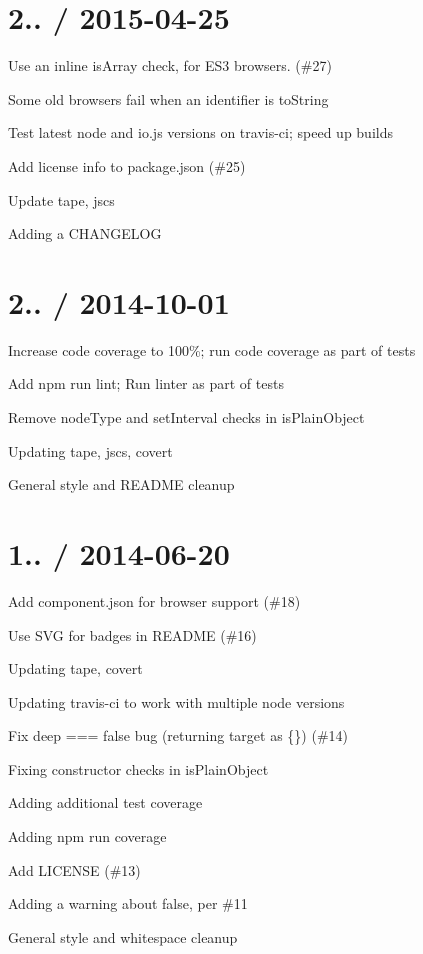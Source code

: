 \section*{2.. / 2015-\/04-\/25 }


\begin{DoxyItemize}
\item Use an inline {\ttfamily is\+Array} check, for E\+S3 browsers. (\#27)
\item Some old browsers fail when an identifier is {\ttfamily to\+String}
\item Test latest {\ttfamily node} and {\ttfamily io.\+js} versions on {\ttfamily travis-\/ci}; speed up builds
\item Add license info to package.\+json (\#25)
\item Update {\ttfamily tape}, {\ttfamily jscs}
\item Adding a C\+H\+A\+N\+G\+E\+L\+OG
\end{DoxyItemize}

\section*{2.. / 2014-\/10-\/01 }


\begin{DoxyItemize}
\item Increase code coverage to 100\%; run code coverage as part of tests
\item Add {\ttfamily npm run lint}; Run linter as part of tests
\item Remove node\+Type and set\+Interval checks in is\+Plain\+Object
\item Updating {\ttfamily tape}, {\ttfamily jscs}, {\ttfamily covert}
\item General style and R\+E\+A\+D\+ME cleanup
\end{DoxyItemize}

\section*{1.. / 2014-\/06-\/20 }


\begin{DoxyItemize}
\item Add component.\+json for browser support (\#18)
\item Use S\+VG for badges in R\+E\+A\+D\+ME (\#16)
\item Updating {\ttfamily tape}, {\ttfamily covert}
\item Updating travis-\/ci to work with multiple node versions
\item Fix {\ttfamily deep === false} bug (returning target as \{\}) (\#14)
\item Fixing constructor checks in is\+Plain\+Object
\item Adding additional test coverage
\item Adding {\ttfamily npm run coverage}
\item Add L\+I\+C\+E\+N\+SE (\#13)
\item Adding a warning about {\ttfamily false}, per \#11
\item General style and whitespace cleanup
\end{DoxyItemize}

